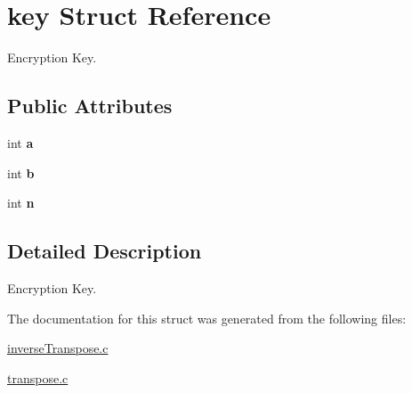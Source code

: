 \hypertarget{structkey}{}\section{key Struct Reference}
\label{structkey}


Encryption Key.  


\subsection*{Public Attributes}
\begin{DoxyCompactItemize}
\item 
\mbox{\label{structkey_a92a3fad8360be3c6beb5b3bac4621eac}} 
int {\bfseries a}
\item 
\mbox{\label{structkey_ae515f468ff25c2d86b614fdc0c4ee87c}} 
int {\bfseries b}
\item 
\mbox{\label{structkey_aea697fb82187088cac2a8ae5add457e8}} 
int {\bfseries n}
\end{DoxyCompactItemize}


\subsection{Detailed Description}
Encryption Key. 

The documentation for this struct was generated from the following files\+:\begin{DoxyCompactItemize}
\item 
\hyperlink{inverseTranspose_8c}{inverse\+Transpose.\+c}\item 
\hyperlink{transpose_8c}{transpose.\+c}\end{DoxyCompactItemize}
